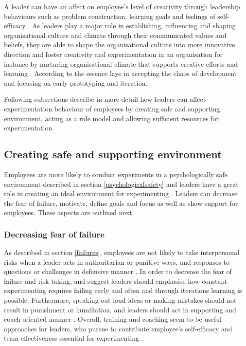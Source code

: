 A leader can have an affect on employee's level of creativity through leadership behaviours such as problem construction, learning goals and feelings of self-efficacy \citet{redmond1993putting}. As leaders play a major role in establishing, influencing and shaping organisational culture and climate through their communicated values and beliefs, they are able to shape the organisational culture into more innovative direction and foster creativity and experimentation in an organisation \citep{jung2003role,schein2010organizational} for instance by nurturing organisational climate that supports creative efforts and learning \citep{yukl2002leadership}. According to \citet{quinn1985managing} the essence lays in accepting the chaos of development and focusing on early prototyping and iteration. 

Following subsections describe in more detail how leaders can affect experimentation behaviour of employees by creating safe and supporting environment, acting as a role model and allowing sufficient resources for experimentation. 

\subsection{Creating safe and supporting environment}
Employees are more likely to conduct experiments in a psychologically safe environment described in section \ref{psychologicalsafety} and leaders have a great role in creating an ideal environment for experimenting \citep{quinn1985managing}. Leaders can decrease the fear of failure, motivate, define goals and focus as well as show support for employees. These aspects are outlined next. 

\subsubsection*{Decreasing fear of failure}
As described in section \ref{failures}, employees are not likely to take interpersonal risks when a leader acts in authoritarian or punitive ways, and responses to questions or challenges in defensive manner \citep{edmondson1999psychological}. In order to decrease the fear of failure and risk-taking, \citet{amabile2008creativity} and \citet{amabile1996assessing} suggest leaders should emphasise how constant experimenting requires failing early and often and through iterations learning is possible. Furthermore, speaking out loud ideas or making mistakes should not result in punishment or humiliation, and leaders should act in supporting and coach-oriented manner \citep{edmondson1999psychological}. Overall, training and coaching seem to be useful approaches for leaders, who pursue to contribute employee's self-efficacy and team effectiveness essential for experimenting \citep{amabile1998kill}. 


